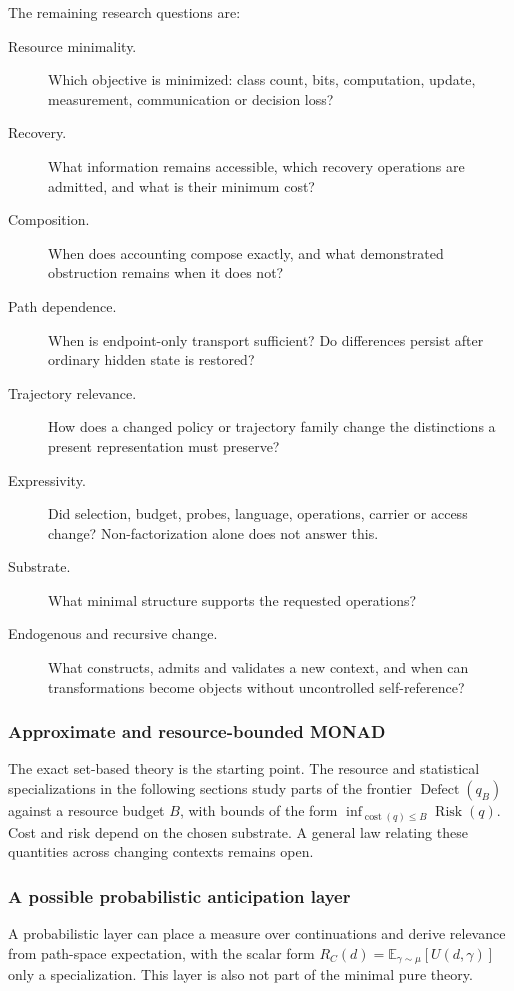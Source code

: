 The remaining research questions are:
\begin{description}
  \item[Resource minimality.] Which objective is minimized: class count,
    bits, computation, update, measurement, communication or decision loss?
  \item[Recovery.] What information remains accessible, which recovery
    operations are admitted, and what is their minimum cost?
  \item[Composition.] When does accounting compose exactly, and what
    demonstrated obstruction remains when it does not?
  \item[Path dependence.] When is endpoint-only transport sufficient?
    Do differences persist after ordinary hidden state is restored?
  \item[Trajectory relevance.] How does a changed policy or trajectory
    family change the distinctions a present representation must preserve?
  \item[Expressivity.] Did selection, budget, probes, language, operations,
    carrier or access change? Non-factorization alone does not answer this.
  \item[Substrate.] What minimal structure supports the requested operations?
  \item[Endogenous and recursive change.] What constructs, admits and
    validates a new context, and when can transformations become objects
    without uncontrolled self-reference?
\end{description}

\subsubsection{Approximate and resource-bounded MONAD}

The exact set-based theory is the starting point. The resource and
statistical specializations in the following sections study parts of the frontier
$\operatorname{Defect}(q_B)$ against a resource budget $B$, with
bounds of the form
$\inf_{\operatorname{cost}(q) \le B} \operatorname{Risk}(q)$. Cost and
risk depend on the chosen substrate. A general law relating these
quantities across changing contexts remains open.

\subsubsection{A possible probabilistic anticipation layer}

A probabilistic layer can place a measure over continuations and
derive relevance from path-space expectation, with the scalar form
$R_C(d) = \mathbb{E}_{\gamma \sim \mu}[U(d, \gamma)]$ only a
specialization. This layer is also not part of the minimal pure
theory.

